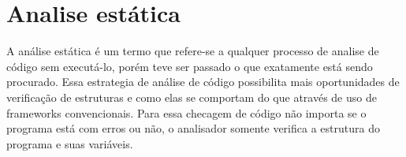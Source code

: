 \chapter{Analise estática}

A análise estática é um termo que refere-se a qualquer processo de analise de código sem executá-lo, porém teve ser passado o que exatamente está sendo procurado. Essa estrategia de análise de código possibilita mais oportunidades de verificação de estruturas e como elas se comportam do que através de uso de frameworks convencionais. Para essa checagem de código não importa se o programa está com erros ou não, o analisador somente verifica a estrutura do programa e suas variáveis.

